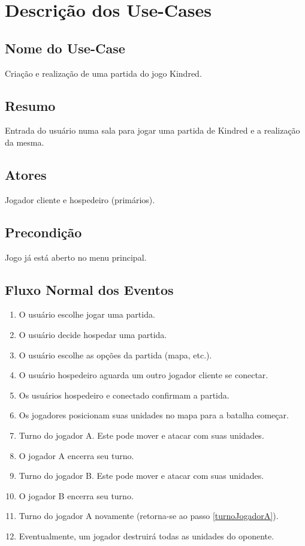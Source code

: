 \section{Descrição dos Use-Cases}


\subsection{Nome do Use-Case}
    Criação e realização de uma partida do jogo Kindred.


\subsection{Resumo}
    Entrada do usuário numa sala para jogar uma partida de Kindred
    e a realização da mesma.


\subsection{Atores}
        Jogador cliente e hospedeiro (primários).


\subsection{Precondição}
    Jogo já está aberto no menu principal.


\subsection{Fluxo Normal dos Eventos}
    \begin{enumerate}
        \item \label{escolhePartida} O usuário escolhe jogar uma partida.
        \item \label{decideHospedar} O usuário decide hospedar uma partida.
        \item O usuário escolhe as opções da partida (mapa, etc.).
        \item O usuário hospedeiro aguarda um outro jogador cliente se conectar.
        \item \label{salaConfirmada} Os usuários hospedeiro e conectado confirmam a partida.
        \item Os jogadores posicionam suas unidades no mapa para a batalha começar.
        \item \label{turnoJogadorA} Turno do jogador A. Este pode mover e atacar com suas unidades.
        \item O jogador A encerra seu turno.
        \item Turno do jogador B. Este pode mover e atacar com suas unidades.
        \item O jogador B encerra seu turno.
        \item Turno do jogador A novamente (retorna-se ao passo \ref{turnoJogadorA}).
        \item \label{exercitoDestruido} Eventualmente, um jogador destruirá todas as unidades do oponente.
    \end{enumerate}


